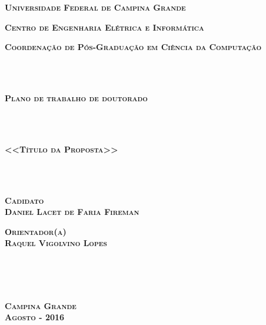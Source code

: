 
\pagestyle{empty}

\begin{center}
{\textbf{\Large \textsc{Universidade Federal de Campina Grande}}}
\end{center}

\begin{center}
\textbf{{\Large \textsc{Centro de Engenharia Elétrica e Informática}}}
\end{center}

\begin{center}
{\large \textsc{\textbf{Coordenação de Pós-Graduação em Ciência da Computação}}}
\end{center}

~\\ \\

\begin{center}
{\LARGE \textsc{\textbf{Plano de trabalho de doutorado}}}
\end{center}

~\\ \\

\begin{center}
{\Large \textsc{\textbf{<<Título da Proposta>>}}}
\end{center}

~\\ \\

\begin{center}
\textbf{\textsc{Cadidato} \\
\textsc{Daniel Lacet de Faria Fireman}}
\end{center}

\begin{center}
\textbf{\textsc{Orientador(a)} \\
\textsc{Raquel Vigolvino Lopes}}
\end{center}

~\\ \\ \\

\begin{center}
\textbf{{\large \textsc{Campina Grande}}
\\
{\large \textsc{Agosto - 2016}}}
\end{center}

\newpage
\cleardoublepage

